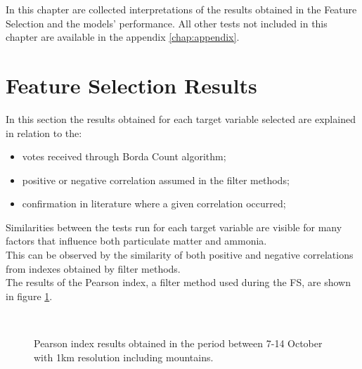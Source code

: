 In this chapter are collected interpretations of the results obtained in the Feature Selection and the models' performance. All other tests not included in this chapter are available in the appendix \ref{chap:appendix}.
\\
\section{Feature Selection Results}
In this section the results obtained for each target variable selected are explained in relation to the:
\begin{itemize}
    \item votes received through Borda Count algorithm;
    \item positive or negative correlation assumed in the filter methods;
    \item confirmation in literature where a given correlation occurred; 
\end{itemize}
Similarities between the tests run for each target variable are visible for many factors that influence both particulate matter and ammonia.\\
This can be observed by the similarity of both positive and negative correlations from indexes obtained by filter methods. \\
The results of the Pearson index, a filter method used during the FS, are shown in figure \ref{fig:pearson_general}. 
\begin{figure}[H]
\centering
{}\\
\caption{Pearson index results obtained in the period between 7-14 October with 1km resolution including mountains.}
\label{fig:pearson_general}
\end{figure}
